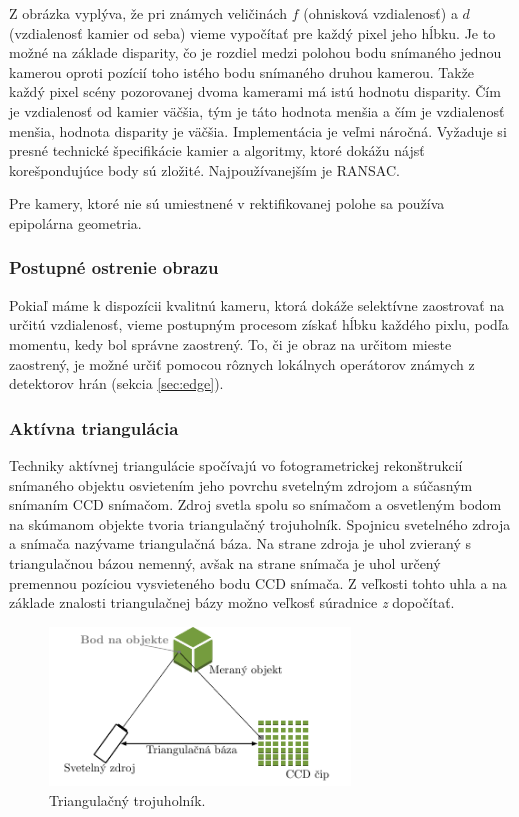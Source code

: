 Z obrázka vyplýva, že pri známych veličinách $f$ (ohnisková vzdialenosť) a $d$ (vzdialenosť kamier od seba) vieme vypočítať pre každý pixel jeho hĺbku. Je to možné na základe disparity, čo je rozdiel medzi polohou bodu snímaného jednou kamerou oproti pozícií toho istého bodu snímaného druhou kamerou. Takže každý pixel scény pozorovanej dvoma kamerami má istú hodnotu disparity. Čím je vzdialenosť od kamier väčšia, tým je táto hodnota menšia a čím je vzdialenosť menšia, hodnota disparity je väčšia. Implementácia je veľmi náročná. Vyžaduje si presné technické špecifikácie kamier a algoritmy, ktoré dokážu nájsť korešpondujúce body sú zložité. Najpoužívanejším je RANSAC. \cite{pocitacove_videnie_v_praxi} 

Pre kamery, ktoré nie sú umiestnené v rektifikovanej  polohe sa používa epipolárna geometria. 

\subsubsection{Postupné ostrenie obrazu }
Pokiaľ máme k dispozícii kvalitnú kameru, ktorá dokáže selektívne zaostrovať na určitú vzdialenosť, vieme postupným procesom získať hĺbku každého pixlu, podľa momentu, kedy bol správne zaostrený. To, či je obraz na určitom mieste zaostrený, je možné určiť pomocou rôznych lokálnych operátorov známych z detektorov hrán (sekcia \ref{sec:edge}). \cite{pocitacove_videnie_v_praxi} 


\subsubsection{Aktívna triangulácia }
\label{sec:activeDeep}
Techniky aktívnej triangulácie spočívajú vo fotogrametrickej rekonštrukcií snímaného objektu osvietením jeho povrchu svetelným zdrojom a súčasným snímaním CCD snímačom. Zdroj svetla spolu so snímačom a osvetleným bodom na skúmanom objekte tvoria triangulačný trojuholník. Spojnicu svetelného zdroja a snímača nazývame triangulačná báza. Na strane zdroja je uhol zvieraný s triangulačnou bázou nemenný, avšak na strane snímača je uhol určený premennou pozíciou vysvieteného bodu CCD snímača. Z veľkosti tohto uhla a na základe znalosti triangulačnej bázy možno veľkosť súradnice \textit{z} dopočítať. \cite{opticke_metody_merania}

 \begin{figure}[H]
\begin{center}
    \includegraphics[width=8cm]{images/activTriang}
    \caption{Triangulačný trojuholník.}
	\end{center}
\end{figure}

